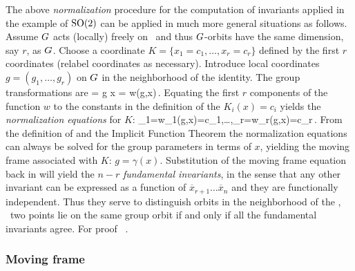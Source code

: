 The above \emph{normalization} procedure for the computation of
invariants applied in the example of $\textrm{SO}(2)$ can be applied
in much more general situations as follows. Assume $G$
acts (locally) freely
on \Manif\  and thus $G$-orbits have the same dimension,
say $r$, as $G$.  Choose a coordinate {\csection}
$K=\{x_1=c_1,\ldots,x_r=c_r\}$ defined by the first $r$
coordinates (relabel coordinates as necessary). Introduce
local coordinates $g=(g_1,\ldots,g_r)$ on $G$ in the
neighborhood of the identity. The group transformations are
\beq
	= g \cdot x = w(g,x)\,.
	\label{eq:transNorm}
\eeq
Equating the first $r$ components of the function $w$ to the
constants in the definition of the {\csection} $K_i(x)=c_i$
yields the \emph{normalization equations} for $K$:
\beq
	_1=w_1(g,x)=c_1,\ldots,_r=w_r(g,x)=c_r\,.
	\label{eq:normalization}
\eeq
From the definition of {\csection} and the Implicit Function
Theorem the normalization equations 
can always be solved for the group parameters in terms of
$x$, yielding the moving frame associated with $K$:
$g=\gamma(x)$. Substitution of the moving frame equation back
in  will yield the $n-r$
\emph{fundamental invariants}, in the sense that any other
invariant can be expressed as a function of
$\overline{x}_{r+1}\ldots\overline{x}_n$ and they are
functionally independent. Thus they serve to distinguish
orbits in the neighborhood of the {\csection}, \ie~two points
lie on the same group orbit if and only if all the
fundamental invariants agree. For proof
\cf~.

\subsubsection{Moving frame}
\label{sec:CLeMF}


